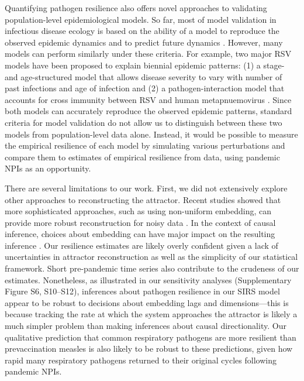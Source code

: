 \documentclass[12pt]{article}
\begin{document}
Quantifying pathogen resilience also offers novel approaches to validating population-level epidemiological models.
So far, most of model validation in infectious disease ecology is based on the ability of a model to reproduce the observed epidemic dynamics and to predict future dynamics \citep{grenfell2002dynamics,bhattacharyya2015cross,pitzer2015environmental,dean2018human,pons2018serotype}.
However, many models can perform similarly under these criteria.
For example, two major RSV models have been proposed to explain biennial epidemic patterns: (1) a stage- and age-structured model that allows disease severity to vary with number of past infections and age of infection \citep{pitzer2015environmental} and (2) a pathogen-interaction model that accounts for cross immunity between RSV and human metapnuemovirus \citep{bhattacharyya2015cross}.
Since both models can accurately reproduce the observed epidemic patterns, standard criteria for model validation do not allow us to distinguish between these two models from population-level data alone.
Instead, it would be possible to measure the empirical resilience of each model by simulating various perturbations and compare them to estimates of empirical resilience from data, using pandemic NPIs as an opportunity.

There are several limitations to our work.
First, we did not extensively explore other approaches to reconstructing the attractor.
Recent studies showed that more sophisticated approaches, such as using non-uniform embedding, can provide more robust reconstruction for noisy data \citep{tan2023selecting}.
In the context of causal inference, choices about embedding can have major impact on the resulting inference \citep{cobey2016limits}.
Our resilience estimates are likely overly confident given a lack of uncertainties in attractor reconstruction as well as the simplicity of our statistical framework.
Short pre-pandemic time series also contribute to the crudeness of our estimates.
Nonetheless, as illustrated in our sensitivity analyses (Supplementary Figure S6, S10--S12), inferences about pathogen resilience in our SIRS model appear to be robust to decisions about embedding lags and dimensions---this is because tracking the rate at which the system approaches the attractor is likely a much simpler problem than making inferences about causal directionality.
Our qualitative prediction that common respiratory pathogens are more resilient than prevaccination measles is also likely to be robust to these predictions, given how rapid many respiratory pathogens returned to their original cycles following pandemic NPIs.
\end{document}
